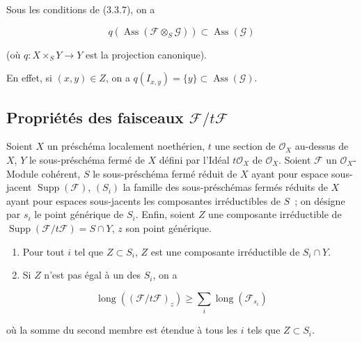 \begin{corollary}[3.3.9]
\label{IV.2.3.3.9-fr}
Sous les conditions de (3.3.7), on a
\end{corollary}

\begin{env}[3.3.9.1]
\label{IV.2.3.3.9.1-fr}
\[
q(\operatorname{Ass}(\mathcal F\otimes_S\mathcal G))
\subset\operatorname{Ass}(\mathcal G)
\]
\end{env}

(où $q:X\times_S Y\to Y$ est la projection canonique).

En effet, si $(x,y)\in Z$, on a
$q(I_{x,y})=\{y\}\subset\operatorname{Ass}(\mathcal G)$.


\subsection{Propriétés des faisceaux $\mathcal F/t\mathcal F$}

\begin{proposition}[3.4.1]
\label{IV.2.3.4.1-fr}
Soient $X$ un préschéma localement noethérien, $t$ une section de
$\mathcal O_X$ au-dessus de $X$, $Y$ le sous-préschéma fermé de $X$ défini par
l'Idéal $t\mathcal O_X$ de $\mathcal O_X$. Soient $\mathcal F$ un
$\mathcal O_X$-Module cohérent, $S$ le sous-préschéma fermé réduit de $X$ ayant
pour espace sous-jacent $\operatorname{Supp}(\mathcal F)$, $(S_i)$ la famille
des sous-préschémas fermés réduits de $X$ ayant pour espaces sous-jacents les
composantes irréductibles de $S$~; on désigne par $s_i$ le point générique de
$S_i$. Enfin, soient $Z$ une composante irréductible de
$\operatorname{Supp}(\mathcal F/t\mathcal F)=S\cap Y$, $z$ son point
générique.
\begin{enumerate}
\item[(i)] Pour tout $i$ tel que $Z\subset S_i$, $Z$ est une composante
irréductible de $S_i\cap Y$.
\item[(ii)] Si $Z$ n'est pas égal à un des $S_i$, on a
\end{enumerate}
\end{proposition}

\begin{env}[3.4.1.1]
\label{IV.2.3.4.1.1-fr}
\[
\operatorname{long}((\mathcal F/t\mathcal F)_z)
\geqslant\sum_i\operatorname{long}(\mathcal F_{s_i})
\]
\end{env}

où la somme du second membre est étendue à tous les $i$ tels que
$Z\subset S_i$.

